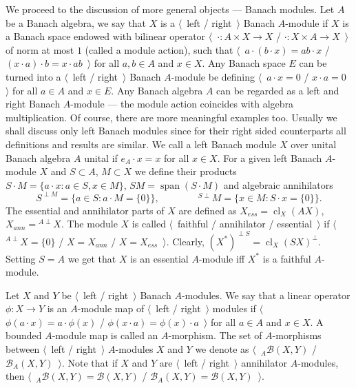 We proceed to the discussion of more general objects --- Banach modules. Let $A$
be a Banach algebra, we say that $X$ is a $\langle$~left / right~$\rangle$
Banach $A$-module if $X$ is a Banach space endowed with bilinear operator
$\langle$~$\cdot:A\times X\to X$ / $\cdot: X\times A\to X$~$\rangle$ of norm at
most $1$ (called a module action), such that 
$\langle$~$a\cdot(b\cdot x)=ab\cdot x$ / 
$(x\cdot a)\cdot b=x\cdot ab$~$\rangle$ for all $a,b\in A$ and $x\in X$.
Any Banach space $E$ can be turned into a $\langle$~left / right~$\rangle$
Banach $A$-module be defining $\langle$~$a\cdot x=0$ / $x\cdot a=0$~$\rangle$
for all $a\in A$ and $x\in E$. Any Banach algebra $A$ can be regarded as a left
and right Banach $A$-module --- the module action coincides with algebra
multiplication. Of course, there are more meaningful examples too.  Usually we
shall discuss only left Banach modules since for their right sided counterparts
all definitions and results are similar. We call a left Banach module $X$ over
unital Banach algebra $A$ unital if $e_A\cdot x=x$ for all $x\in X$. For a given
left Banach $A$-module $X$ and $S\subset A$, $M\subset X$ we define their
products $S\cdot M= \{a\cdot x:a\in S, x\in M \}$, 
$SM=\operatorname{span} (S\cdot M)$ and algebraic annihilators 
$$
S^{\perp M}= \{a\in S:a\cdot M= \{0 \} \},
\qquad\qquad
{}^{S\perp}M= \{x\in M: S\cdot x= \{0 \} \}.
$$ 
The essential and annihilator
parts of $X$ are defined as $X_{ess}=\operatorname{cl}_X(A X)$,
$X_{ann}={}^{A\perp}X$. The module $X$ is called $\langle$~faithful /
annihilator / essential~$\rangle$ if $\langle$~${}^{A\perp}X= \{0 \}$ /
$X=X_{ann}$ / $X=X_{ess}$~$\rangle$. Clearly, 
${(X^*)}^{\perp S}={\operatorname{cl}_X(S X)}^\perp$. Setting $S=A$ we get that 
$X$ is an essential $A$-module iff $X^*$ is a faithful $A$-module.

Let $X$ and $Y$ be $\langle$~left / right~$\rangle$ Banach $A$-modules. We say
that a linear operator $\phi:X\to Y$ is an $A$-module map of $\langle$~left /
right~$\rangle$ modules if $\langle$~$\phi(a\cdot x)=a\cdot \phi(x)$ /
$\phi(x\cdot a)=\phi(x)\cdot a$~$\rangle$ for all $a\in A$ and $x\in X$. A
bounded $A$-module map is called an $A$-morphism. The set of $A$-morphisms
between $\langle$~left / right~$\rangle$ $A$-modules $X$ and $Y$ we denote as
$\langle$~${}_A\mathcal{B}(X,Y)$ / $\mathcal{B}_A(X,Y)$~$\rangle$. Note that if
$X$ and $Y$ are $\langle$~left / right~$\rangle$ annihilator $A$-modules, then
$\langle$~${}_A\mathcal{B}(X,Y)=\mathcal{B}(X,Y)$ /
$\mathcal{B}_A(X,Y)=\mathcal{B}(X,Y)$~$\rangle$.

